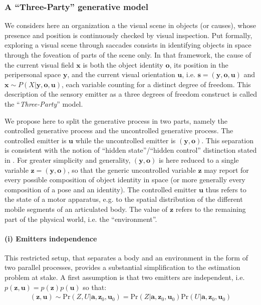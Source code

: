 \documentclass[12pt,twoside,openright]{article}
\begin{document}
\subsubsection{A ``Three-Party'' generative model}

We considers here an organization a the visual scene in objects (or causes), whose presence and position is continuously checked by visual inspection. 
Put formally, exploring a visual scene through saccades consists in identifying objects in space through the foveation of parts of the scene only. 
In that framework, the cause of the current visual field $\boldsymbol{x}$ is both the object identity $\boldsymbol{o}$, its position in the peripersonal space $\boldsymbol{y}$, and the current visual orientation $\boldsymbol{u}$, i.e. $\boldsymbol{s} = (\boldsymbol{y},\boldsymbol{o},\boldsymbol{u})$ and $\boldsymbol{x} \sim P(X|\boldsymbol{y},\boldsymbol{o},\boldsymbol{u})$, each variable counting for a distinct degree of freedom. This description of the sensory emitter as a three degrees of freedom construct is called the ``\emph{Three-Party}'' model.

We propose here to split the generative process in two parts, namely the controlled generative process and the uncontrolled generative process. 
The controlled emitter is $\boldsymbol{u}$ while the uncontrolled emitter is  $(\boldsymbol{y}, \boldsymbol{o})$. This separation 
is consistent with the notion of ``hidden state''/``hidden control'' distinction stated in \cite{friston2012perceptions}.
For greater simplicity and generality, $(\boldsymbol{y},\boldsymbol{o})$ is here reduced to a single variable $\boldsymbol{z} = (\boldsymbol{y}, \boldsymbol{o})$, 
so that the generic uncontrolled variable $\boldsymbol{z}$ may report for every possible composition of object identity in space (or more generally every composition of a pose and an identity).
The controlled emitter $\boldsymbol{u}$ thus refers to the state of a motor apparatus, e.g. to the spatial distribution of the different mobile segments of an articulated body. The value of $\boldsymbol{z}$ refers to the remaining part of the physical world, i.e. the ``environment''. 


\paragraph{(i) Emitters independence}
This restricted setup, that separates a body and an environment in the form of two parallel processes,  provides a substantial simplification to the estimation problem at stake.  
A first assumption is that two emitters are independent, i.e. $p(\boldsymbol{z}, \boldsymbol{u}) = p(\boldsymbol{z})p(\boldsymbol{u})$ so that:
\begin{align}
(\boldsymbol{z},\boldsymbol{u}) \sim \text{Pr}(Z,U|\boldsymbol{a}, \boldsymbol{z}_0, \boldsymbol{u}_0) = \text{Pr}(Z|\boldsymbol{a}, \boldsymbol{z}_0, \boldsymbol{u}_0) \text{Pr}(U|\boldsymbol{a}, \boldsymbol{z}_0, \boldsymbol{u}_0)\nonumber
\end{align}
	
\end{document}
